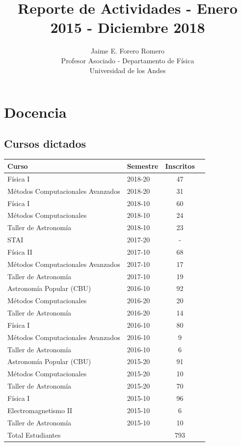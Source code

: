 \documentclass{article}
\title{Reporte de Actividades - Enero 2015 - Diciembre 2018}
\author{Jaime E. Forero Romero\\Profesor Asociado - Departamento de
  F\'isica\\Universidad de los Andes}
\begin{document}
\maketitle
\tableofcontents
\newpage

\section{Docencia}

\subsection{Cursos dictados}
\begin{tabular}{p{6.5cm} l c c}\hline
Curso & Semestre & Inscritos\\\hline
F\'isica I & 2018-20 &  47 \\
M\'etodos Computacionales Avanzados & 2018-20 &   31 \\\hline
F\'isica I & 2018-10 &   60\\
M\'etodos Computacionales & 2018-10 &  24 \\
Taller de Astronom\'ia & 2018-10 &  23 \\\hline
STAI & 2017-20 & - \\\hline
F\'isica II & 2017-10 & 68 \\
M\'etodos Computacionales Avanzados & 2017-10 & 17 \\ 
Taller de Astronom\'ia & 2017-10 & 19 \\\hline
Astronom\'ia Popular (CBU) & 2016-10 & 92 \\
M\'etodos Computacionales & 2016-20 & 20 \\
Taller de Astronom\'ia & 2016-20 & 14 \\\hline
F\'isica I & 2016-10 & 80 \\
M\'etodos Computacionales Avanzados & 2016-10 & 9 \\
Taller de Astronom\'ia & 2016-10 & 6 \\\hline
Astronom\'ia Popular (CBU) & 2015-20 & 91 \\ 
M\'etodos Computacionales & 2015-20 & 10 \\
Taller de Astronom\'ia & 2015-20 & 70 \\\hline
F\'isica I & 2015-10 & 96 \\
Electromagnetismo II & 2015-10 & 6  \\
Taller de Astronom\'ia & 2015-10 & 10 \\\hline
Total Estudiantes & & 793 & \\\hline
\end{tabular}
\end{document}
